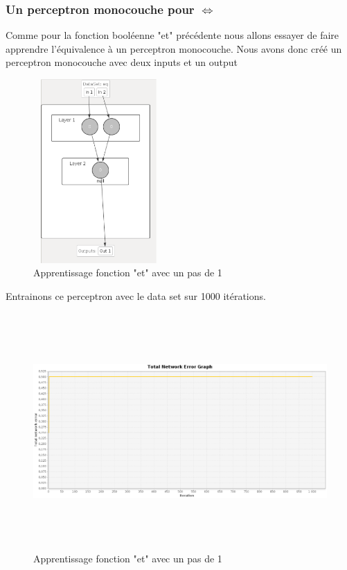 \documentclass[twoside,openright,a4paper,11pt,french]{article}
\begin{document}
\subsubsection{Un perceptron monocouche pour $\Leftrightarrow$}

Comme pour la fonction booléenne "et" précédente nous allons essayer de faire apprendre
l'équivalence à un perceptron monocouche. Nous avons donc créé un perceptron monocouche
avec deux inputs et un output

\begin{figure}[h]
\centering
\includegraphics[width=5cm,height=7cm]{./pics/eq/perceptron_mono.eps}
\caption{Apprentissage fonction "et" avec un pas de 1}
\label{fig:anderr4}
\end{figure}

Entrainons ce perceptron avec le data set sur 1000 itérations.

\begin{figure}[h]
\centering
\includegraphics[width=12cm,height=9cm]{./pics/eq/mono_eq_def.eps}
\caption{Apprentissage fonction "et" avec un pas de 1}
\label{fig:anderr4}
\end{figure}
\end{document}
